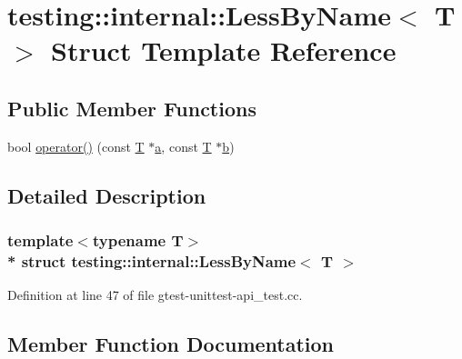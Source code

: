 \hypertarget{structtesting_1_1internal_1_1_less_by_name}{}\section{testing\+:\+:internal\+:\+:Less\+By\+Name$<$ T $>$ Struct Template Reference}
\label{structtesting_1_1internal_1_1_less_by_name}
\subsection*{Public Member Functions}
\begin{DoxyCompactItemize}
\item 
bool \hyperlink{structtesting_1_1internal_1_1_less_by_name_a62386ac7750bfc035536be55d90a52eb}{operator()} (const \hyperlink{functions__7_8js_adf1f3edb9115acb0a1e04209b7a9937b}{T} $\ast$\hyperlink{_07copy_08_2_read_camera_model_8m_a551a3d351eadcc0b9b1a2f24f0fb5ea0}{a}, const \hyperlink{functions__7_8js_adf1f3edb9115acb0a1e04209b7a9937b}{T} $\ast$\hyperlink{jquery_8js_a2fa551895933fae935a0a6b87282241d}{b})
\end{DoxyCompactItemize}


\subsection{Detailed Description}
\subsubsection*{template$<$typename T$>$\\*
struct testing\+::internal\+::\+Less\+By\+Name$<$ T $>$}



Definition at line 47 of file gtest-\/unittest-\/api\+\_\+test.\+cc.



\subsection{Member Function Documentation}
